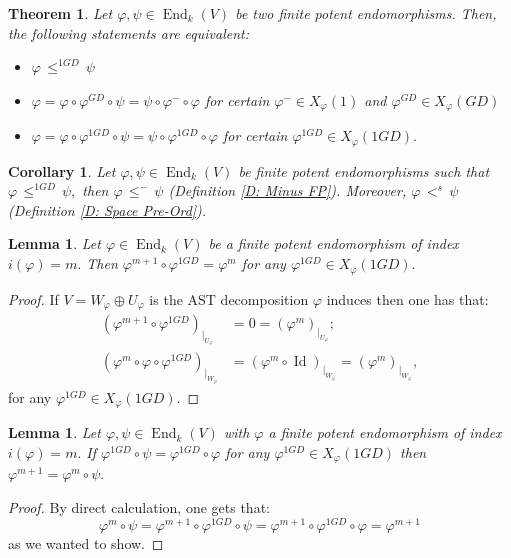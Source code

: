 \documentclass[10pt,a4paper]{amsart}
\newtheorem{thm}[defn]{Theorem}
\newtheorem{cor}[defn]{Corollary}
\newtheorem{lem}[defn]{Lemma}
\theoremstyle{plain}
\theoremstyle{remark}
\numberwithin{equation}{section} \numberwithin{defn}{section}
\newcommand\ed{\operatorname{End}}
\newcommand{\f}{\varphi}
\newcommand{\g}{\psi}
\newcommand\Id{\operatorname{Id}}
\begin{document}
\begin{thm}\label{T: 3 equiv 1GD}
Let $\f, \g \in \ed_k(V)$ be two finite potent endomorphisms. Then, the following statements are equivalent: \begin{itemize}
\item[I.)]$\f \, \leq^{1GD}\, \g$
\item[II.)]$\f=\f\circ \f^{GD}\circ \g=\g\circ \f^-\circ \f$ for certain $\f^-\in X_{\f}(1)$ and $\f^{GD}\in X_{\f}(GD)$
\item[III.)]$\f=\f\circ \f^{1GD}\circ \g=\g\circ \f^{1GD}\circ \f$ for certain $\f^{1GD}\in X_{\f}(1GD).$
\end{itemize}
\end{thm} 

\begin{cor}\label{C: 1GD implica minus y space}
Let $\f , \g\in \ed_k(V)$ be finite potent endomorphisms such that $\f \, \leq^{1GD}\, \g,$ then $\f \, \leq^{-}\, \g $ (Definition \ref{D: Minus FP}). Moreover, $\f \, <^s \, \g$ (Definition \ref{D: Space Pre-Ord}).
\end{cor}


\begin{lem}\label{L: 1GD cancel m+1}
Let $\f \in \ed_k(V)$ be a finite potent endomorphism of index $i(\f)=m .$ Then $\f^{m+1}\circ \f^{1GD}=\f^m$ for any $\f^{1GD}\in X_{\f}(1GD).$
\end{lem}
\begin{proof}
If $V=W_{\f}\oplus U_{\f}$ is the AST decomposition $\f$ induces then one has that: \begin{align*}
(\f^{m+1}\circ \f^{1GD})_{\vert_{U_{\f}}} & =0=(\f^m)_{\vert_{U_{\f}}}; \\
(\f^m\circ \f \circ \f^{1GD})_{\vert_{W_{\f}}}&=(\f^m\circ \Id)_{\vert_{W_{\f}}}=(\f^m)_{\vert_{W_{\f}}},
\end{align*} for any $\f^{1GD}\in X_{\f}(1GD).$
\end{proof}

\begin{lem}\label{L: fm+1 fmg}
Let $\f , \g \in \ed_k(V)$ with $\f$ a finite potent endomorphism of index $i(\f)=m.$ If $\f^{1GD}\circ \g =\f^{1GD}\circ \f$ for any $\f^{1GD}\in X_{\f}(1GD)$ then $\f^{m+1}=\f^m \circ \g .$
\end{lem}
\begin{proof}
By direct calculation, one gets that: $$\f^m\circ \g=\f^{m+1}\circ \f^{1GD}\circ \g=\f^{m+1}\circ \f^{1GD}\circ\f =\f^{m+1} $$ as we wanted to show.
\end{proof}
\end{document}

